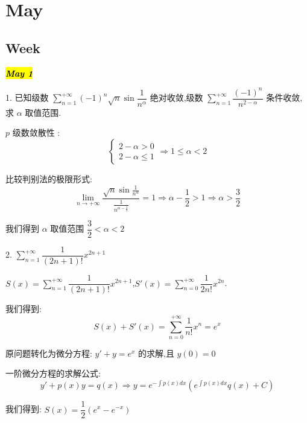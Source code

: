 \chapter{May}
\section{Week }
\hl{\textbf{\textit{May 1}}}

1. 已知级数 $\sum\limits_{n=1}^{+\infty}(-1)^n\sqrt{n}\sin \dfrac{1}{n^{\alpha}}$ 绝对收敛,级数 $\sum\limits_{n=1}^{+\infty}\dfrac{(-1)^n}{n^{2-\alpha}}$ 条件收敛,求 $\alpha$ 取值范围.
\begin{solution}
	
	$p$ 级数敛散性 : 
	$$\left\lbrace \begin{array}{l}
		2-\alpha>0\\2-\alpha\leq 1
	\end{array}\right. \Rightarrow 1\leq\alpha<2$$
	
	比较判别法的极限形式: 
	$$\lim\limits_{n\rightarrow+\infty}\dfrac{\sqrt{n}\sin\frac{1}{n^{\alpha}}}{\frac{1}{n^{\alpha-\frac{1}{2}}}}=1\Rightarrow \alpha-\frac{1}{2}>1\Rightarrow \alpha >\frac{3}{2}$$
	
	我们得到 $\alpha$ 取值范围 $\dfrac{3}{2}<\alpha<2$
\end{solution}


2. $\sum\limits_{n=1}^{+\infty}\dfrac{1}{(2n+1)!}x^{2n+1}$
\begin{solution}
	
	$S(x)=\sum\limits_{n=1}^{+\infty}\dfrac{1}{(2n+1)!}x^{2n+1}$,$S'(x)=\sum\limits_{n=0}^{+\infty}\dfrac{1}{2n!}x^{2n}$.
	
	我们得到: $$S(x)+S'(x)=\sum\limits_{n=0}^{+\infty}\frac{1}{n!}x^{n}=e^{x}$$
	
	原问题转化为微分方程: $y'+y=e^x$ 的求解,且 $y(0)=0$
	
	一阶微分方程的求解公式: $$y'+p(x)y=q(x)\Rightarrow y=e^{-\int p(x)dx}(e^{\int p(x)dx}q(x)+C)$$
	
	我们得到:  $S(x)=\dfrac{1}{2}(e^{x}-e^{-x})$
\end{solution}


